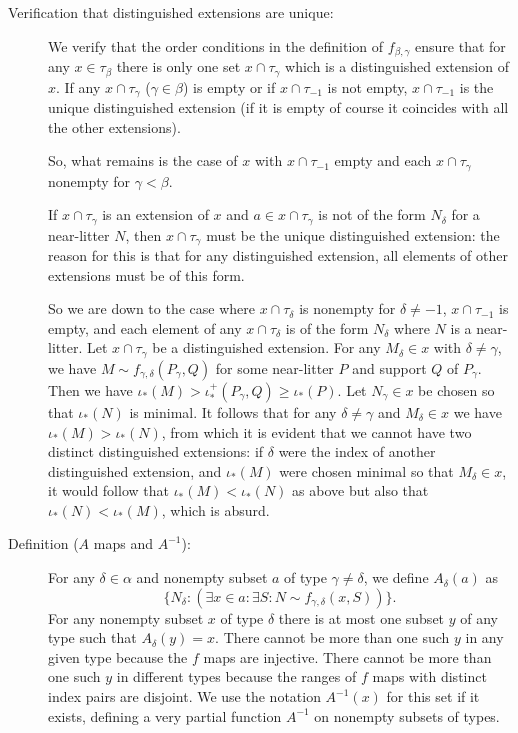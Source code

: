 \documentclass[112pt]{article}
\begin{document}
\begin{description}

\item[Verification that distinguished extensions are unique:]  

We verify  that the order conditions in the definition of $f_{\beta,\gamma}$ ensure that for any $x \in \tau_\beta$ there is only one set $x \cap \tau_\gamma$ which is a distinguished extension of $x$.  If any $x \cap \tau_\gamma$ ($\gamma \in \beta$) is empty or if $x \cap \tau_{-1}$ is not empty, $x \cap \tau_{-1}$ is the unique distinguished extension
(if it is empty of course it coincides with all the other extensions).

So, what remains is the case of $x$ with $x \cap \tau_{-1}$ empty and each $x \cap \tau_\gamma$ nonempty for $\gamma<\beta$.

If $x \cap \tau_\gamma$ is an extension of $x$ and $a \in x \cap \tau_\gamma$ is not of the form $N_\delta$ for a near-litter $N$, then
$x \cap \tau_\gamma$ must be the unique distinguished extension:  the reason for this is that for any distinguished extension, all elements of other extensions must be of this form.

So we are down to the case where $x \cap \tau_\delta$ is nonempty for $\delta \neq -1$, $x \cap \tau_{-1}$ is empty, and each element of
any $x \cap \tau_\delta$ is of the form $N_\delta$ where $N$ is a near-litter.  Let $x \cap \tau_\gamma$ be a distinguished extension.
For any $M_\delta \in x$ with $\delta \neq \gamma$, we have $M \sim f_{\gamma,\delta}(P_\gamma,Q)$ for some near-litter $P$ and support $Q$
of $P_\gamma$.  Then we have $\iota_*(M) > \iota^+_*(P_\gamma,Q) \geq \iota_*(P)$.  Let $N_\gamma\in x$ be chosen so that $\iota_*(N)$ is minimal.
It follows that for any $\delta \neq \gamma$ and $M_\delta \in x$ we have $\iota_*(M) > \iota_*(N)$, from which it is evident that we cannot have two distinct distinguished extensions:
if $\delta$ were the index of another distinguished extension, and $\iota_*(M)$ were chosen minimal so that $M_\delta \in x$, it would follow that $\iota_*(M)<\iota_*(N)$ as above
but also that $\iota_*(N) < \iota_*(M)$, which is absurd.

\item[Definition ($A$ maps and $A^{-1}$):] For any $\delta \in \alpha$ and nonempty subset $a$ of type $\gamma \neq \delta$, we define $A_\delta(a)$ as $$\{N_\delta:(\exists x \in a:\exists S:N \sim f_{\gamma,\delta}(x,S))\}.$$  For any nonempty subset $x$ of type $\delta$ there is at most one subset $y$ of any type such that $A_\delta(y)=x$.  There cannot be more than one such $y$ in any given type because the $f$ maps are injective.  There cannot be more than one such $y$ in different types because the ranges of $f$ maps with distinct index pairs are disjoint.   We use the notation $A^{-1}(x)$ for this set if it exists, defining a very partial function $A^{-1}$ on nonempty subsets of types.

\end{description}
\end{document}
